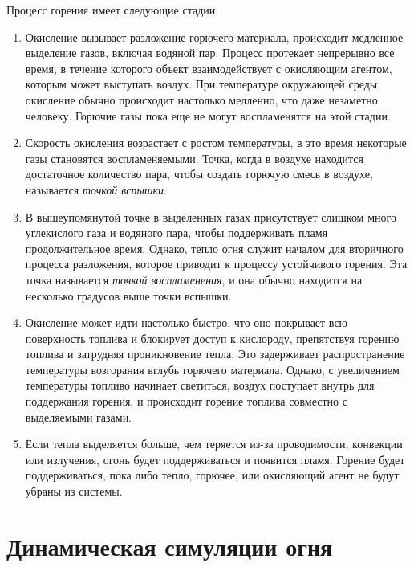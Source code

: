 Процесс горения имеет следующие стадии:
\begin{enumerate}
    \item Окисление вызывает разложение горючего материала, происходит \break{}
        медленное выделение газов, включая водяной пар.  Процесс протекает
        непрерывно все время, в течение которого объект взаимодействует с
        окисляющим агентом, которым может выступать воздух.  При температуре
        окружающей среды окисление обычно происходит настолько медленно, что
        даже незаметно человеку. Горючие газы пока еще не могут воспламенятся на
        этой стадии.

    \item Скорость окисления возрастает с ростом температуры, в это время
        некоторые газы становятся воспламеняемыми. Точка, когда в воздухе
        находится достаточное количество пара, чтобы создать горючую смесь в
        воздухе, называется \emph{точкой вспышки}.

    \item В вышеупомянутой точке в выделенных газах присутствует слишком много
        углекислого газа и водяного пара, чтобы поддерживать пламя
        продолжительное время. Однако, тепло огня служит началом для вторичного
        процесса разложения, которое приводит к процессу устойчивого горения.
        Эта точка называется \emph{точкой воспламенения}, и она обычно находится
        на несколько градусов выше точки вспышки.

    \item Окисление может идти настолько быстро, что оно покрывает всю
        поверхность топлива и блокирует доступ к кислороду, препятствуя горению
        топлива и затрудняя проникновение тепла. Это задерживает распространение
        температуры возгорания вглубь горючего материала. Однако, с увеличением
        температуры топливо начинает светиться, воздух поступает внутрь для
        поддержания горения, и происходит горение топлива совместно с
        выделяемыми газами.

    \item Если тепла выделяется больше, чем теряется из-за проводимости,
        конвекции или излучения, огонь будет поддерживаться и появится пламя.
        Горение будет поддерживаться, пока либо тепло, горючее, или окисляющий
        агент не будут убраны из системы.
\end{enumerate}

\section{Динамическая симуляции огня}

